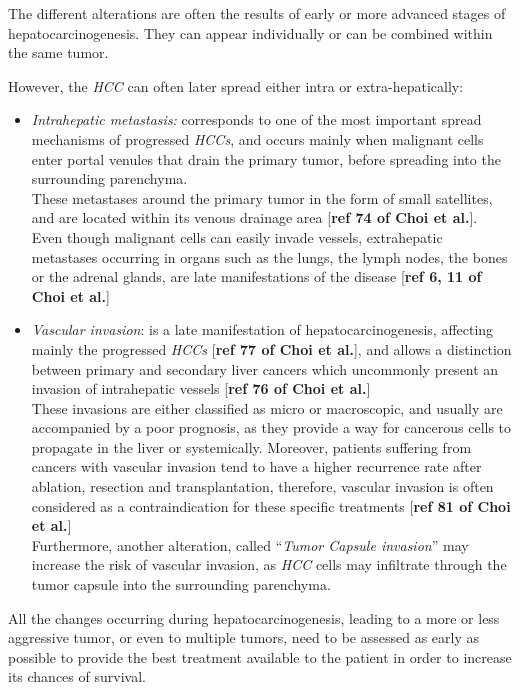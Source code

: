 \documentclass[]{article}
\providecommand{\tightlist}{%
  \setlength{\itemsep}{0pt}\setlength{\parskip}{0pt}}
\begin{document}
The different alterations are often the results of early or more
advanced stages of hepatocarcinogenesis. They can appear individually or
can be combined within the same tumor.

However, the \emph{HCC} can often later spread either intra or
extra-hepatically:

\begin{itemize}
\tightlist
\item
  \emph{Intrahepatic metastasis: }corresponds to one of the most
  important spread mechanisms of progressed \emph{HCCs}, and occurs
  mainly when malignant cells enter portal venules that drain the
  primary tumor, before spreading into the surrounding parenchyma.\\
  These metastases around the primary tumor in the form of small
  satellites, and are located within its venous drainage area
  {[}\textbf{ref 74 of Choi et al.}{]}. Even though malignant cells can
  easily invade vessels, extrahepatic metastases occurring in organs
  such as the lungs, the lymph nodes, the bones or the adrenal glands,
  are late manifestations of the disease {[}\textbf{ref 6, 11 of Choi et
  al.}{]}
\item
  \emph{Vascular invasion}: is a late manifestation of
  hepatocarcinogenesis, affecting mainly the progressed \emph{HCCs}
  {[}\textbf{ref 77 of Choi et al.}{]}, and allows a distinction between
  primary and secondary liver cancers which uncommonly present an
  invasion of intrahepatic vessels {[}\textbf{ref 76 of Choi et
  al.}{]}\\
  These invasions are either classified as micro or macroscopic, and
  usually are accompanied by a poor prognosis, as they provide a way for
  cancerous cells to propagate in the liver or systemically. Moreover,
  patients suffering from cancers with vascular invasion tend to have a
  higher recurrence rate after ablation, resection and transplantation,
  therefore, vascular invasion is often considered as a contraindication
  for these specific treatments {[}\textbf{ref 81 of Choi et al.}{]}\\
  Furthermore, another alteration, called ``\emph{Tumor Capsule
  invasion}'' may increase the risk of vascular invasion, as \emph{HCC}
  cells may infiltrate through the tumor capsule into the surrounding
  parenchyma.
\end{itemize}

All the changes occurring during hepatocarcinogenesis, leading to a more
or less aggressive tumor, or even to multiple tumors, need to be
assessed as early as possible to provide the best treatment available to
the patient in order to increase its chances of survival.
\end{document}
